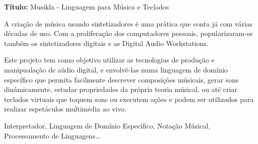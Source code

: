 \textbf{Título:} Musikla - Linguagem para Música e Teclados

\bigskip

A criação de música usando sintetizadores é uma prática que conta já com várias décadas de uso. Com a proliferação dos computadores pessoais, popularizaram-se também os sintetizadores digitais e as Digital Audio Workstations.

Este projeto tem como objetivo utilizar as tecnologias de produção e manipualação de aúdio digital, e envolvê-las numa linguagem de domínio específico que permita facilmente descrever composições músicais, gerar sons dinâmicamente, estudar propriedades da própria teoria músical, ou até criar teclados virtuais que toquem sons ou executem ações e podem ser utilizados para realizar espetáculos multimédia ao vivo.
\begin{keywords}
Interpretador, Linguagem de Domínio Específico, Notação Músical, Processamento de Linguagens\ldots
\end{keywords}
